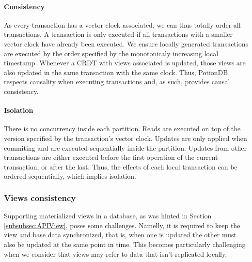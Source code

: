 \documentclass{vldb}
\begin{document}
\paragraph{Consistency} As every transaction has a vector clock associated, we can thus totally order all transactions. 
A transaction is only executed if all transactions with a smaller vector clock have already been executed. 
We ensure locally generated transactions are executed by the order specified by the monotonicaly increasing local timestamp.
Whenever a CRDT with views associated is updated, those views are also updated in the same transaction with the same clock.
Thus, PotionDB respects causality when executing transactions and, as such, provides causal consistency.

\paragraph{Isolation} %
There is no concurrency inside each partition.
Reads are executed on top of the version specified by the transaction's vector clock. %
Updates are only applied when commiting and are executed sequentially inside the partition.
Updates from other transactions are either executed before the first operation of the current transaction, or after the last.
Thus, the effects of each local transaction can be ordered sequentially, which implies isolation.


\subsubsection{Views consistency}
\label{subsec:viewsconsistency}

Supporting materialized views in a database, as was hinted in Section \ref{subsubsec:APIView}, poses some challenges.
Namelly, it is required to keep the view and base data synchronized, that is, when one is updated the other must also be updated at the same point in time.
This becomes particularly challenging when we consider that views may refer to data that isn't replicated locally.
\end{document}
